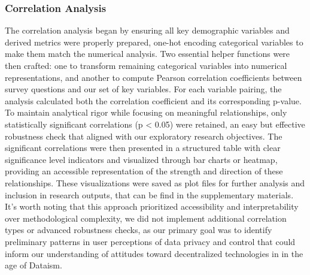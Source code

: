 	\subsubsection{Correlation Analysis}
	The correlation analysis began by ensuring all key demographic variables and derived metrics were properly prepared, one-hot encoding categorical variables to make them match the numerical analysis. Two essential helper functions were then crafted: one to transform remaining categorical variables into numerical representations, and another to compute Pearson correlation coefficients between survey questions and our set of key variables. For each variable pairing, the analysis calculated both the correlation coefficient and its corresponding p-value. To maintain analytical rigor while focusing on meaningful relationships, only statistically significant correlations (p < 0.05) were retained, an easy but effective robustness check that aligned with our exploratory research objectives. The significant correlations were then presented in a structured table with clear significance level indicators and visualized through bar charts or heatmap, providing an accessible representation of the strength and direction of these relationships. These visualizations were saved as plot files for further analysis and inclusion in research outputs, that can be find in the supplementary materials. It's worth noting that this approach prioritized accessibility and interpretability over methodological complexity, we did not implement additional correlation types or advanced robustness checks, as our primary goal was to identify preliminary patterns in user perceptions of data privacy and control that could inform our understanding of attitudes toward decentralized technologies in in the age of Dataism.
